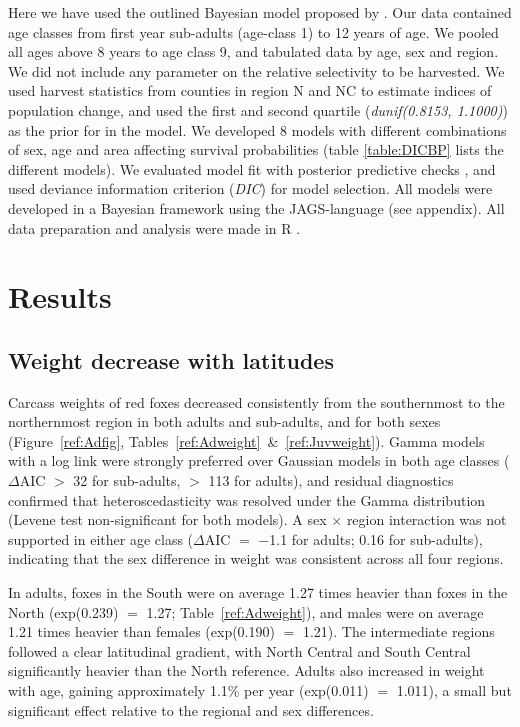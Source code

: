 \documentclass[12pt, a4paper]{article}
\begin{document}
Here we have used the outlined Bayesian model proposed by \citet{skellyFlexibleBayesianApproach}. Our data contained age classes from first year sub-adults (age-class 1) to 12 years of age. We pooled all ages above 8 years to age class 9, and tabulated data by age, sex and region. We did not include any parameter on the relative selectivity to be harvested. We used harvest statistics from counties in region N and NC to estimate indices of population change, and used the first and second quartile (\emph{dunif(0.8153, 1.1000)}) as the prior for \lambda in the model. We developed 8 models  with different combinations of sex, age and area affecting survival probabilities (table \ref{table:DICBP} lists the different models). We evaluated model fit with posterior predictive checks \citep{kery2010introduction}, and used deviance information criterion (\emph{DIC}) for model selection. All models were developed in a Bayesian framework using the JAGS-language \citep{plummer2003jags} (see appendix). All data preparation and analysis were made in R \citep{rcoreteamLanguageEnvironmentStatistical2024}.

\section*{Results}

\subsection*{Weight decrease with latitudes}

Carcass weights of red foxes decreased consistently from the southernmost to the northernmost region in both adults and sub-adults, and for both sexes (Figure~\ref{ref:Adfig}, Tables~\ref{ref:Adweight}~\&~\ref{ref:Juvweight}). Gamma models with a log link were strongly preferred over Gaussian models in both age classes ($\Delta$AIC $>$ 32 for sub-adults, $>$ 113 for adults), and residual diagnostics confirmed that heteroscedasticity was resolved under the Gamma distribution (Levene test non-significant for both models). A sex $\times$ region interaction was not supported in either age class ($\Delta$AIC $=$ $-$1.1 for adults; 0.16 for sub-adults), indicating that the sex difference in weight was consistent across all four regions.

In adults, foxes in the South were on average 1.27 times heavier than foxes in the North (exp(0.239) $=$ 1.27; Table~\ref{ref:Adweight}), and males were on average 1.21 times heavier than females (exp(0.190) $=$ 1.21). The intermediate regions followed a clear latitudinal gradient, with North Central and South Central significantly heavier than the North reference. Adults also increased in weight with age, gaining approximately 1.1\% per year (exp(0.011) $=$ 1.011), a small but significant effect relative to the regional and sex differences.
\end{document}
